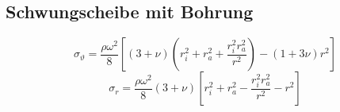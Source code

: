 	\subsection{Schwungscheibe mit Bohrung} %
		\begin{equation*}
			\sigma_\vartheta = \frac{\rho \omega^2}{8} \left[ (3+\nu)\left( r_i^2 +r_a^2 + \frac{r_i^2 r_a^2}{r^2}\right) - (1 + 3\nu)r^2\right]
		\end{equation*}
		\begin{equation*}
			\sigma_r =  \frac{\rho \omega^2}{8} (3+\nu) \left[ r_i^2 + r_a^2 - \frac{r_i^2r_a^2}{r^2} - r^2\right]
		\end{equation*}
